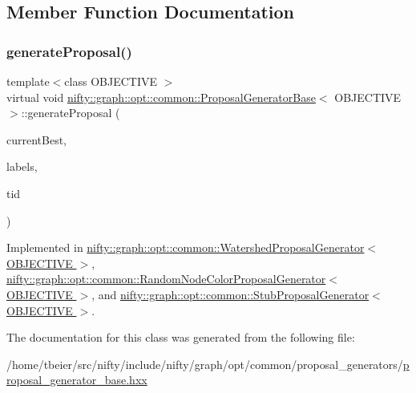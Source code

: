 \subsection{Member Function Documentation}
\mbox{\label{classnifty_1_1graph_1_1opt_1_1common_1_1ProposalGeneratorBase_abb7b02d650049f52733b3f2dc81bb395}} 
\subsubsection{\texorpdfstring{generate\+Proposal()}{generateProposal()}}
{\footnotesize\ttfamily template$<$class O\+B\+J\+E\+C\+T\+I\+VE $>$ \\
virtual void \hyperlink{classnifty_1_1graph_1_1opt_1_1common_1_1ProposalGeneratorBase}{nifty\+::graph\+::opt\+::common\+::\+Proposal\+Generator\+Base}$<$ O\+B\+J\+E\+C\+T\+I\+VE $>$\+::generate\+Proposal (\begin{DoxyParamCaption}\item[{const \hyperlink{classnifty_1_1graph_1_1opt_1_1common_1_1ProposalGeneratorBase_a122993da5c326628cdb865a6279d20c5}{Proposal\+Type} \&}]{current\+Best,  }\item[{\hyperlink{classnifty_1_1graph_1_1opt_1_1common_1_1ProposalGeneratorBase_a122993da5c326628cdb865a6279d20c5}{Proposal\+Type} \&}]{labels,  }\item[{const size\+\_\+t}]{tid }\end{DoxyParamCaption})\hspace{0.3cm}{\ttfamily [pure virtual]}}



Implemented in \hyperlink{classnifty_1_1graph_1_1opt_1_1common_1_1WatershedProposalGenerator_a0dadaa8e06ec15ac6e892ecc2fa6ad97}{nifty\+::graph\+::opt\+::common\+::\+Watershed\+Proposal\+Generator$<$ O\+B\+J\+E\+C\+T\+I\+V\+E $>$}, \hyperlink{classnifty_1_1graph_1_1opt_1_1common_1_1RandomNodeColorProposalGenerator_a5862fcb54e6f7332b6466ecc8371aef4}{nifty\+::graph\+::opt\+::common\+::\+Random\+Node\+Color\+Proposal\+Generator$<$ O\+B\+J\+E\+C\+T\+I\+V\+E $>$}, and \hyperlink{classnifty_1_1graph_1_1opt_1_1common_1_1StubProposalGenerator_a38c36aac9cf548bbc9871ccb865709d7}{nifty\+::graph\+::opt\+::common\+::\+Stub\+Proposal\+Generator$<$ O\+B\+J\+E\+C\+T\+I\+V\+E $>$}.



The documentation for this class was generated from the following file\+:\begin{DoxyCompactItemize}
\item 
/home/tbeier/src/nifty/include/nifty/graph/opt/common/proposal\+\_\+generators/\hyperlink{common_2proposal__generators_2proposal__generator__base_8hxx}{proposal\+\_\+generator\+\_\+base.\+hxx}\end{DoxyCompactItemize}
